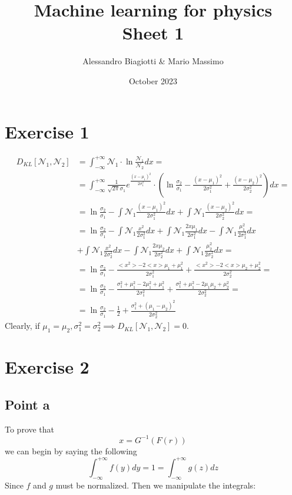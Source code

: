 \documentclass{article}
\title{Machine learning for physics \\ \large Sheet 1}
\author{Alessandro Biagiotti \& Mario Massimo}
\date{October 2023}
\newcommand{\gss}{\mathcal{N}}
\newcommand{\gexp}[1]{\frac{1}{\sqrt{2\pi} \sigma_{#1}} e^{\frac{(x - \mu_{#1})^2}{2\sigma_{#1}^2}}}
\begin{document}
\maketitle
\section{Exercise 1}
\begin{align*}
    D_{KL}[\mathcal{N}_1, \mathcal{N}_2] &= \int_{-\infty}^{+\infty}{\gss_1 \cdot \ln{\frac{\gss_1}{\gss_2}} dx} =\\
    &= \int_{-\infty}^{+\infty}{\gexp{1} \cdot \left(\ln{\frac{\sigma_2}{\sigma_1}} - \frac{(x - \mu_1)^2}{2\sigma_1^2} + \frac{(x - \mu_2)^2}{2\sigma_2^2}\right)dx} =\\
    &= \ln{\frac{\sigma_2}{\sigma_1}} - \int{\gss_1\frac{(x - \mu_1)^2}{2\sigma_1^2}dx} + \int{\gss_1\frac{(x - \mu_2)^2}{2\sigma_2^2}dx} =\\
    &= \ln{\frac{\sigma_2}{\sigma_1}} - \int{\gss_1\frac{x^2}{2\sigma_1^2}dx} + \int{\gss_1\frac{2x\mu_1}{2\sigma_1^2}dx} - \int{\gss_1\frac{\mu_1^2}{2\sigma_1^2}dx} \\
    &+ \int{\gss_1\frac{x^2}{2\sigma_2^2}dx} - \int{\gss_1\frac{2x\mu_2}{2\sigma_2^2}dx} + \int{\gss_1\frac{\mu_2^2}{2\sigma_2^2}dx} =\\
    &= \ln{\frac{\sigma_2}{\sigma_1}} - \frac{<x^2> - 2<x>\mu_1 + \mu_1^2}{2\sigma_1^2} + \frac{<x^2> - 2<x>\mu_2 + \mu_2^2}{2\sigma_2^2} =\\
    &= \ln{\frac{\sigma_2}{\sigma_1}} - \frac{\sigma_1^2 + \mu_1^2 - 2\mu_1^2 + \mu_1^2}{2\sigma_1^2} + \frac{\sigma_1^2 + \mu_1^2 - 2\mu_1\mu_2 + \mu_2^2}{2\sigma_2^2} =\\
    &= \ln{\frac{\sigma_2}{\sigma_1}} - \frac{1}{2} + \frac{\sigma_1^2 + (\mu_1 - \mu_2)^2}{2\sigma_2^2}
\end{align*}
Clearly, if $\mu_1 = \mu_2, \sigma^2_1 = \sigma^2_2 \implies  D_{KL}[\mathcal{N}_1, \mathcal{N}_2] = 0$.

\section{Exercise 2}

\subsection{Point a}
To prove that
\begin{equation*}
    x = G^{-1}(F(r))
\end{equation*}
we can begin by saying the following
\begin{equation*}
    \int_{-\infty}^{+\infty}{f(y)dy} = 1 = \int_{-\infty}^{+\infty}{g(z)dz}
\end{equation*}
Since $f$ and $g$ must be normalized. Then we manipulate the integrals:
\end{document}
